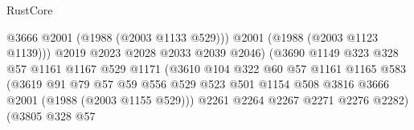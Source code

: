 \begin{lexlean}{RustCore}
\begin{coremodule}
                                              @3666
                                              @2001
                                              (@1988 (@2003 @1133 @529)))
                                            @2001
                                            (@1988 (@2003 @1123 @1139)))
                                          @2019
                                          @2023
                                          @2028
                                          @2033
                                          @2039
                                          @2046)
                                        (@3690
                                          @1149
                                          @323
                                          @328
                                          @57
                                          @1161
                                          @1167
                                          @529
                                          @1171
                                          (@3610
                                            @104
                                            @322
                                            @60
                                            @57
                                            @1161
                                            @1165
                                            @583
                                            (@3619
                                              @91
                                              @79
                                              @57
                                              @59
                                              @556
                                              @529
                                              @523
                                              @501
                                              @1154
                                              @508
                                              @3816
                                              @3666
                                              @2001
                                              (@1988 (@2003 @1155 @529)))
                                            @2261
                                            @2264
                                            @2267
                                            @2271
                                            @2276
                                            @2282)
                                          (@3805
                                            @328
                                            @57

\end{coremodule}
\end{lexlean}
